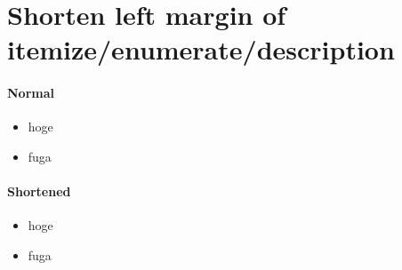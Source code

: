 \documentclass{article}
\begin{document}
\section{Shorten left margin of itemize/enumerate/description}

\paragraph{Normal}

\begin{itemize}
	\item hoge
	\item fuga
\end{itemize}

\paragraph{Shortened}

\begin{itemize}[leftmargin=*]
	\item hoge
	\item fuga
\end{itemize}
\end{document}
